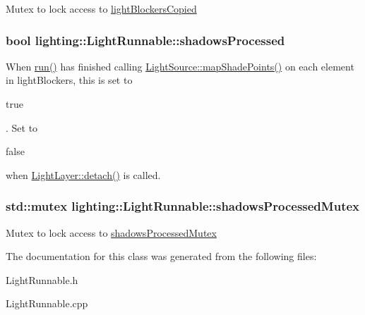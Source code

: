 Mutex to lock access to \hyperlink{classlighting_1_1LightRunnable_a46924d29904d80326c4bdeb093a2b4be}{light\+Blockers\+Copied} 

\subsubsection[{\texorpdfstring{shadows\+Processed}{shadowsProcessed}}]{\setlength{\rightskip}{0pt plus 5cm}bool lighting\+::\+Light\+Runnable\+::shadows\+Processed}\hypertarget{classlighting_1_1LightRunnable_a1419a712f1959e928739b95fe43b3171}{}\label{classlighting_1_1LightRunnable_a1419a712f1959e928739b95fe43b3171}


When \hyperlink{classlighting_1_1LightRunnable_abd7dfb6a9fc5efd3730326eb85d852d0}{run()} has finished calling \hyperlink{classlighting_1_1LightSource_a5bbde61a54af327d43dc4afee751412c}{Light\+Source\+::map\+Shade\+Points()} on each element in light\+Blockers, this is set to 
\begin{DoxyCode}
\textcolor{keyword}{true}
\end{DoxyCode}
. Set to 
\begin{DoxyCode}
\textcolor{keyword}{false}
\end{DoxyCode}
 when \hyperlink{classlighting_1_1LightLayer_ac4f833f7d7d72586f8efef6967282889}{Light\+Layer\+::detach()} is called. 

\subsubsection[{\texorpdfstring{shadows\+Processed\+Mutex}{shadowsProcessedMutex}}]{\setlength{\rightskip}{0pt plus 5cm}std\+::mutex lighting\+::\+Light\+Runnable\+::shadows\+Processed\+Mutex}\hypertarget{classlighting_1_1LightRunnable_a6c66e5f8a25b1e9c6bb1263d52d777bf}{}\label{classlighting_1_1LightRunnable_a6c66e5f8a25b1e9c6bb1263d52d777bf}


Mutex to lock access to \hyperlink{classlighting_1_1LightRunnable_a6c66e5f8a25b1e9c6bb1263d52d777bf}{shadows\+Processed\+Mutex} 



The documentation for this class was generated from the following files\+:\begin{DoxyCompactItemize}
\item 
Light\+Runnable.\+h\item 
Light\+Runnable.\+cpp\end{DoxyCompactItemize}
